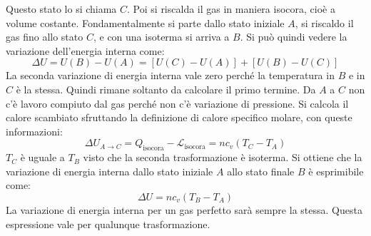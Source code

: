 \documentclass[10pt,a4paper]{book}
\begin{document}
\FloatBarrier
Questo stato lo si chiama $C$. Poi si riscalda il gas in maniera isocora, cioè a volume costante. Fondamentalmente si parte dallo stato iniziale $A$, si riscaldo il gas fino allo stato $C$, e con una isoterma si arriva a $B$.
Si può quindi vedere la variazione dell'energia interna come:
\[
	\Delta U = U(B)-U(A) = [U(C)-U(A)] + [U(B)-U(C)]
\]
La seconda variazione di energia interna vale zero perché la temperatura in $B$ e in $C$ è la stessa. Quindi rimane soltanto da calcolare il primo termine. Da $A$ a $C$ non c'è lavoro compiuto dal gas perché non c'è variazione di pressione. Si calcola il calore scambiato sfruttando la definizione di calore specifico molare, con queste informazioni:
\[
	\Delta U_{A\to C} = Q_{\text{isocora} } - \mathcal{L}_{\text{isocora} } = nc_v(T_C-T_A  )
\]
$T_C$ è uguale a $T_B$ visto che la seconda trasformazione è isoterma. Si ottiene che la variazione di energia interna dallo stato iniziale $A$ allo stato finale $B$ è esprimibile come:
\[
	\Delta U = nc_v(T_B-T_A  )
\]
La variazione di energia interna per un gas perfetto sarà sempre la stessa. Questa espressione vale per qualunque trasformazione.
\end{document}
